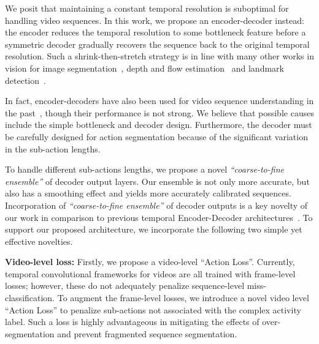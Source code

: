 \documentclass[10pt,twocolumn,letterpaper]{article}
\begin{document}
We posit that maintaining a constant temporal resolution is suboptimal for handling video sequences.  In this work, we propose an encoder-decoder instead: the encoder reduces the temporal resolution to some bottleneck feature before a symmetric decoder gradually recovers the sequence back to the original temporal resolution. Such a shrink-then-stretch strategy is in line with many other works in vision for image segmentation~\cite{ronneberger2015u, dac-spp-unet}, depth and flow estimation~\cite{tu2019real} and landmark detection~\cite{newell2016stacked, landmarkdetect-yang2017stacked}.  

In fact, encoder-decoders have also been used for video sequence understanding in the past~\cite{TED-lea2017temporal, TEDresi-lei2018temporal, TED-ding2018weakly}, though their performance is not strong. 
We believe that possible causes include the simple bottleneck and decoder design. Furthermore, the decoder must be carefully designed for action segmentation because of the significant variation in the sub-action lengths.  

To handle different sub-actions lengths, we propose a novel \textit{``coarse-to-fine ensemble''} of decoder output layers. Our ensemble is not only more accurate, but also has a smoothing effect and yields more accurately calibrated sequences. Incorporation of \textit{``coarse-to-fine ensemble''} of decoder outputs is a key novelty of our work in comparison to previous temporal Encoder-Decoder architectures~\cite{TED-lea2017temporal, TEDresi-lei2018temporal, TED-ding2018weakly}. To support our proposed architecture, we incorporate the following two simple yet effective novelties. 

\textbf{Video-level loss:}
Firstly, we propose a video-level ``Action Loss''.  Currently, temporal convolutional frameworks for videos are all trained with frame-level losses; however, these do not adequately penalize sequence-level miss-classification. To augment the frame-level losses, we introduce a novel video level ``Action Loss'' to penalize sub-actions not associated with the complex activity label. Such a loss is highly advantageous in mitigating the effects of over-segmentation and prevent fragmented sequence segmentation. 
\end{document}
